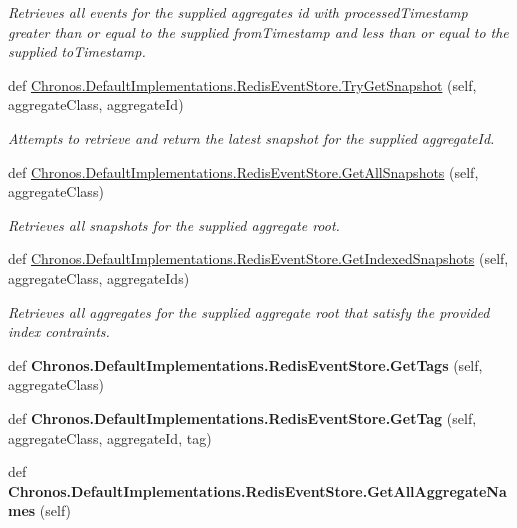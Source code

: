 \begin{DoxyCompactItemize}
\begin{DoxyCompactList}\small\item\em Retrieves all events for the supplied aggregate\textquotesingle{}s id with processed\+Timestamp greater than or equal to the supplied from\+Timestamp and less than or equal to the supplied to\+Timestamp. \end{DoxyCompactList}\item 
def \hyperlink{group__Chronos_ga36ff3627316ace7a057bbbc2afab72c6}{Chronos.\+Default\+Implementations.\+Redis\+Event\+Store.\+Try\+Get\+Snapshot} (self, aggregate\+Class, aggregate\+Id)
\begin{DoxyCompactList}\small\item\em Attempts to retrieve and return the latest snapshot for the supplied aggregate\+Id. \end{DoxyCompactList}\item 
def \hyperlink{group__Chronos_gaff0db56eede5a1e7f18cf025e4fe11cd}{Chronos.\+Default\+Implementations.\+Redis\+Event\+Store.\+Get\+All\+Snapshots} (self, aggregate\+Class)
\begin{DoxyCompactList}\small\item\em Retrieves all snapshots for the supplied aggregate root. \end{DoxyCompactList}\item 
def \hyperlink{group__Chronos_gaaffd95b785639b226c4358f443fb072d}{Chronos.\+Default\+Implementations.\+Redis\+Event\+Store.\+Get\+Indexed\+Snapshots} (self, aggregate\+Class, aggregate\+Ids)
\begin{DoxyCompactList}\small\item\em Retrieves all aggregates for the supplied aggregate root that satisfy the provided index contraints. \end{DoxyCompactList}\item 
def {\bfseries Chronos.\+Default\+Implementations.\+Redis\+Event\+Store.\+Get\+Tags} (self, aggregate\+Class)\hypertarget{group__Chronos_gac4ad397371031694c0c36eff7e7066fc}{}\label{group__Chronos_gac4ad397371031694c0c36eff7e7066fc}

\item 
def {\bfseries Chronos.\+Default\+Implementations.\+Redis\+Event\+Store.\+Get\+Tag} (self, aggregate\+Class, aggregate\+Id, tag)\hypertarget{group__Chronos_gacf65957f79c53cfafb1a0f2db2aea44c}{}\label{group__Chronos_gacf65957f79c53cfafb1a0f2db2aea44c}

\item 
def {\bfseries Chronos.\+Default\+Implementations.\+Redis\+Event\+Store.\+Get\+All\+Aggregate\+Names} (self)\hypertarget{group__Chronos_gab4e79beb4363ee98dfdf705a7375f94f}{}\label{group__Chronos_gab4e79beb4363ee98dfdf705a7375f94f}


\end{DoxyCompactItemize}
